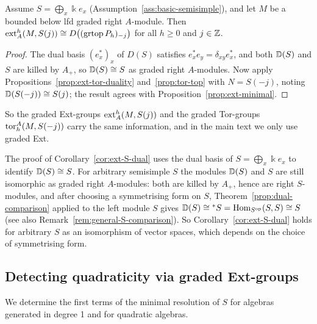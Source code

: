\begin{advanced}[suppressfirstparskip=true,innertopmargin=0pt]
\begin{corollary}\label{cor:ext-S-dual}
Assume $S=\bigoplus_x\Bbbk e_x$ (Assumption~\ref{ass:basic-semisimple}), and let $M$ be  a bounded below lfd graded right $A$-module.
Then $\operatorname{ext}\nolimits_A^h(M,S(j))\cong D\bigl((\operatorname{grtop}\nolimits P_h)_{-j}\bigr)$ for all $h\geq0$ and $j\in\mathbb{Z}$.
\end{corollary}

\begin{proof}
The dual basis $(e_x^*)_x$ of $D(S)$ satisfies $e_x^*e_y=\delta_{xy}e_x^*$, and both $\mathbb{D}(S)$ and $S$ are killed by $A_+$, so $\mathbb{D}(S)\cong S$ as graded right $A$-modules.
Now apply Propositions~\ref{prop:ext-tor-duality} and~\ref{prop:tor-top} with $N=S(-j)$, noting $\mathbb{D}(S(-j))\cong S(j)$; the result agrees with Proposition~\ref{prop:ext-minimal}.
\end{proof}

So the graded Ext-groups $\operatorname{ext}\nolimits_A^h(M,S(j))$ and the graded Tor-groups $\operatorname{tor}\nolimits_h^A(M,S(-j))$ carry the same information, and in the main text we only use graded Ext.

\begin{remark}[General $S$]\label{rem:tor-general-S}
The proof of Corollary~\ref{cor:ext-S-dual} uses the dual basis of $S=\bigoplus_x\Bbbk e_x$ to identify $\mathbb{D}(S)\cong S$.
For arbitrary semisimple $S$ the modules $\mathbb{D}(S)$ and $S$ are still isomorphic as graded right $A$-modules: both are killed by $A_+$, hence are right $S$-modules, and after choosing a symmetrising form on $S$, Theorem~\ref{prop:dual-comparison} applied to the left module $S$ gives $\mathbb{D}(S)\cong{}^*S=\operatorname{Hom}\nolimits_{S^{\mathrm{op}}}(S,S)\cong S$ (see also Remark~\ref{rem:general-S-comparison}).
So Corollary~\ref{cor:ext-S-dual} holds for arbitrary $S$ as an isomorphism of vector spaces, which depends on the choice of symmetrising form.
\end{remark}
\end{advanced}

\subsection{Detecting quadraticity via graded Ext-groups}

We determine the first terms of the minimal resolution of $S$ for algebras generated in degree 1 and for quadratic algebras.


